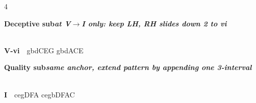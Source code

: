 \documentclass[letterpaper,12pt]{article}
\begin{document}
\begin{multicols}{4}
\noindent\colorbox{hdr1}{\begin{minipage}{\dimexpr\linewidth-2\fboxsep\relax}\raggedright\color{white}\bfseries Deceptive sub\quad\normalfont\itshape at V$\to$I only: keep LH, RH slides down 2 to vi\end{minipage}}\\[0.1mm]
\noindent\hangindent=0.25in {\color{lhcol}\bfseries V-vi}~~{\ttfamily gbdCEG gbdACE}\\[0.1mm]
\vspace{1.5mm}

\noindent\colorbox{hdr1}{\begin{minipage}{\dimexpr\linewidth-2\fboxsep\relax}\raggedright\color{white}\bfseries Quality sub\quad\normalfont\itshape same anchor, extend pattern by appending one 3-interval\end{minipage}}\\[0.1mm]
\noindent\hangindent=0.25in {\color{lhcol}\bfseries I}~~{\ttfamily cegDFA cegbDFAC}\\[0.1mm]
\vspace{1.5mm}



\end{multicols}
\end{document}
